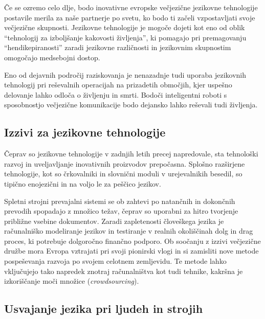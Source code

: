 \begin{multicols}{2}

Če se ozremo celo dlje, bodo inovativne evropske večjezične jezikovne tehnologije postavile merila za naše partnerje po svetu, ko bodo ti začeli vzpostav\-ljati svoje večjezične skupnosti. Jezikovne tehnologije je mogoče dojeti kot eno od oblik “tehnologij za izboljšanje kakovosti živ\-ljenja”, ki pomagajo pri premagovanju “hendikepiranosti” zaradi jezikovne različnosti in jezikovnim skupnostim omogočajo medsebojni dostop.

Eno od dejavnih področij raziskovanja je nenazadnje tudi uporaba jezikovnih tehnologij pri reševalnih operacijah na prizadetih območjih, kjer uspešno delovanje lahko odloča o živ\-ljenju in smrti. Bodoči inteligentni roboti s sposobnostjo večjezične komunikacije bodo dejansko lahko reševali tudi živ\-ljenja.

\subsection{Izzivi za jezikovne tehnologije}

Čeprav so jezikovne tehnologije v zadnjih letih precej napredovale, sta tehnološki razvoj in uveljav\-ljanje inovativnih proizvodov prepočasna. Splošno razširjene tehnologije, kot so črkovalniki in slovnični moduli v urejevalnikih besedil, so tipično enojezični in na voljo le za peščico jezikov. 


Spletni stroj\-ni prevajalni sistemi se ob zah\-tevi po natančnih in dokončnih prevodih spopadajo z množico težav, čeprav so uporabni za hitro tvorjenje približne vsebine dokumentov. Zaradi zapletenosti človeškega jezika je računalniško mode\-liranje jezikov in testiranje v realnih okoliščinah dolg in drag proces, ki potrebuje dolgoročno finančno podporo. Ob soočanju z izzivi večjezične družbe mora Evropa vztrajati pri svoji pionirski vlogi in si zamisliti nove metode pospeševanja razvoja po svojem celotnem zemljevidu. Te metode lahko vključujejo tako napredek znotraj računalništva kot tudi tehnike, kakršna je izkoriščanje moči množice (\textit{crowdsourcing}).

\subsection{Usvajanje jezika pri ljudeh in strojih}


\end{multicols}
